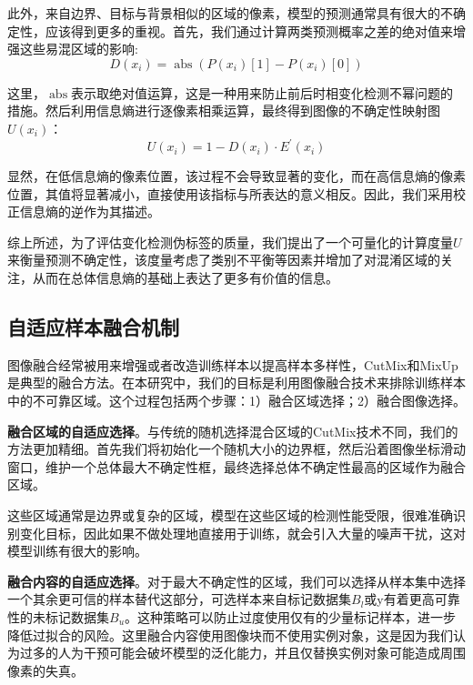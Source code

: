 \documentclass[lang=chs, degree=master, blindreview=false, adobe=false]{yanputhesis}
\begin{document}
此外，来自边界、目标与背景相似的区域的像素，模型的预测通常具有很大的不确定性，应该得到更多的重视。首先，我们通过计算两类预测概率之差的绝对值来增强这些易混区域的影响:
\begin{equation}
  \label{eq:abs}
  D\left(x_{i}\right)=\operatorname{abs}\left(P\left(x_{i}\right)[1]-P\left(x_{i}\right)[0]\right)
\end{equation}

这里，$\operatorname{abs}$表示取绝对值运算，这是一种用来防止前后时相变化检测不幂问题的措施。然后利用信息熵进行逐像素相乘运算，最终得到图像的不确定性映射图$U\left(x_{i}\right)$：
\begin{equation}
  \label{eq:uncertainty}
  U\left(x_{i}\right)=1-D\left(x_{i}\right) \cdot E^{\prime}\left(x_{i}\right)
\end{equation}

显然，在低信息熵的像素位置，该过程不会导致显著的变化，而在高信息熵的像素位置，其值将显著减小，直接使用该指标与所表达的意义相反。因此，我们采用校正信息熵的逆作为其描述。

综上所述，为了评估变化检测伪标签的质量，我们提出了一个可量化的计算度量$U$来衡量预测不确定性，该度量考虑了类别不平衡等因素并增加了对混淆区域的关注，从而在总体信息熵的基础上表达了更多有价值的信息。
\subsection{自适应样本融合机制}
图像融合经常被用来增强或者改造训练样本以提高样本多样性，CutMix\cite{yun2019cutmix}和MixUp\cite{zhang2017mixup}是典型的融合方法。在本研究中，我们的目标是利用图像融合技术来排除训练样本中的不可靠区域。这个过程包括两个步骤：1）融合区域选择；2）融合图像选择。

\textbf{融合区域的自适应选择}。与传统的随机选择混合区域的CutMix技术不同，我们的方法更加精细。首先我们将初始化一个随机大小的边界框，然后沿着图像坐标滑动窗口，维护一个总体最大不确定性框，最终选择总体不确定性最高的区域作为融合区域。

这些区域通常是边界或复杂的区域，模型在这些区域的检测性能受限，很难准确识别变化目标，因此如果不做处理地直接用于训练，就会引入大量的噪声干扰，这对模型训练有很大的影响。

\textbf{融合内容的自适应选择}。对于最大不确定性的区域，我们可以选择从样本集中选择一个其余更可信的样本替代这部分，可选样本来自标记数据集$B_l$或y有着更高可靠性的未标记数据集$B_u$。这种策略可以防止过度使用仅有的少量标记样本，进一步降低过拟合的风险。这里融合内容使用图像块而不使用实例对象，这是因为我们认为过多的人为干预可能会破坏模型的泛化能力，并且仅替换实例对象可能造成周围像素的失真。
\end{document}
